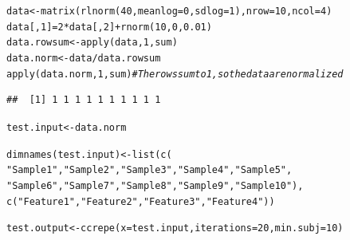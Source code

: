 \documentclass{article}\usepackage[]{graphicx}\usepackage[usenames,dvipsnames]{color}
\newcommand{\hlnum}[1]{\textcolor[rgb]{0.816,0.125,0.439}{#1}}%
\newcommand{\hlstr}[1]{\textcolor[rgb]{0.251,0.627,0.251}{#1}}%
\newcommand{\hlcom}[1]{\textcolor[rgb]{0.502,0.502,0.502}{\textit{#1}}}%
\newcommand{\hlopt}[1]{\textcolor[rgb]{0,0,0}{#1}}%
\newcommand{\hlstd}[1]{\textcolor[rgb]{0.251,0.251,0.251}{#1}}%
\newcommand{\hlkwb}[1]{\textcolor[rgb]{0,0,0}{#1}}%
\newcommand{\hlkwc}[1]{\textcolor[rgb]{0.251,0.251,0.251}{#1}}%
\newcommand{\hlkwd}[1]{\textcolor[rgb]{0.878,0.439,0.125}{#1}}%
\newenvironment{knitrout}{}{} %
\begin{document}
\begin{knitrout}
\color{fgcolor}\begin{kframe}
\begin{alltt}
\hlstd{data} \hlkwb{<-} \hlkwd{matrix}\hlstd{(}\hlkwd{rlnorm}\hlstd{(}\hlnum{40}\hlstd{,}\hlkwc{meanlog}\hlstd{=}\hlnum{0}\hlstd{,}\hlkwc{sdlog}\hlstd{=}\hlnum{1}\hlstd{),}\hlkwc{nrow}\hlstd{=}\hlnum{10}\hlstd{,}\hlkwc{ncol}\hlstd{=}\hlnum{4}\hlstd{)}
\hlstd{data[,}\hlnum{1}\hlstd{]} \hlkwb{=} \hlnum{2}\hlopt{*}\hlstd{data[,}\hlnum{2}\hlstd{]} \hlopt{+} \hlkwd{rnorm}\hlstd{(}\hlnum{10}\hlstd{,}\hlnum{0}\hlstd{,}\hlnum{0.01}\hlstd{)}
\hlstd{data.rowsum} \hlkwb{<-} \hlkwd{apply}\hlstd{(data,}\hlnum{1}\hlstd{,sum)}
\hlstd{data.norm} \hlkwb{<-} \hlstd{data}\hlopt{/}\hlstd{data.rowsum}
\hlkwd{apply}\hlstd{(data.norm,}\hlnum{1}\hlstd{,sum)}  \hlcom{# The rows sum to 1, so the data are normalized}
\end{alltt}
\begin{verbatim}
##  [1] 1 1 1 1 1 1 1 1 1 1
\end{verbatim}
\begin{alltt}
\hlstd{test.input} \hlkwb{<-} \hlstd{data.norm}

\hlkwd{dimnames}\hlstd{(test.input)} \hlkwb{<-} \hlkwd{list}\hlstd{(}\hlkwd{c}\hlstd{(}
 \hlstr{"Sample 1"}\hlstd{,} \hlstr{"Sample 2"}\hlstd{,}\hlstr{"Sample 3"}\hlstd{,}\hlstr{"Sample 4"}\hlstd{,}\hlstr{"Sample 5"}\hlstd{,}
 \hlstr{"Sample 6"}\hlstd{,}\hlstr{"Sample 7"}\hlstd{,}\hlstr{"Sample 8"}\hlstd{,}\hlstr{"Sample 9"}\hlstd{,}\hlstr{"Sample 10"}\hlstd{),}
 \hlkwd{c}\hlstd{(}\hlstr{"Feature 1"}\hlstd{,} \hlstr{"Feature 2"}\hlstd{,} \hlstr{"Feature 3"}\hlstd{,}\hlstr{"Feature 4"}\hlstd{))}

\hlstd{test.output} \hlkwb{<-} \hlkwd{ccrepe}\hlstd{(}\hlkwc{x}\hlstd{=test.input,} \hlkwc{iterations}\hlstd{=}\hlnum{20}\hlstd{,} \hlkwc{min.subj}\hlstd{=}\hlnum{10}\hlstd{)}
\end{alltt}
\end{kframe}
\end{knitrout}
\end{document}

